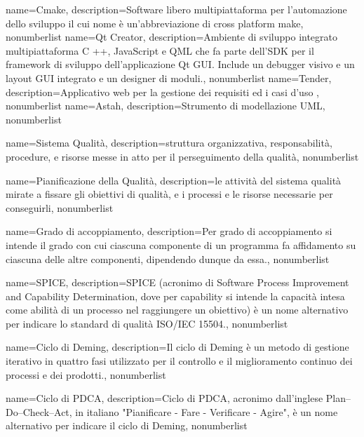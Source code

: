 {
	name={Cmake},
	description={Software libero multipiattaforma per l'automazione dello sviluppo il cui nome è un'abbreviazione di cross platform make},
	nonumberlist
}
{
	name={Qt Creator},
	description={Ambiente di sviluppo integrato multipiattaforma C ++, JavaScript e QML che fa parte dell'SDK per il framework di sviluppo dell'applicazione Qt GUI. Include un debugger visivo e un layout GUI integrato e un designer di moduli.},
	nonumberlist
}
{
	name={Tender},
	description={Applicativo web per la gestione dei requisiti ed i casi d'uso },
	nonumberlist
}
{
	name={Astah},
	description={Strumento di modellazione UML},
	nonumberlist
}

{
	name={Sistema Qualità},
	description={struttura organizzativa, responsabilità, procedure, e risorse messe in atto per il perseguimento della qualità},
	nonumberlist 
}

{
	name={Pianificazione della Qualità},
	description={le attività del sistema qualità mirate a fissare gli obiettivi di qualità, e i processi e le risorse necessarie per conseguirli},
	nonumberlist 
}

{
	name={Grado di accoppiamento},
	description={Per grado di accoppiamento si intende il grado con cui ciascuna componente di un programma fa affidamento su ciascuna delle altre componenti, dipendendo dunque da essa.},
	nonumberlist 
}

{
	name={SPICE},
	description={SPICE (acronimo di Software Process Improvement and Capability Determination, dove per capability si intende la capacità intesa come abilità di un processo nel raggiungere un obiettivo) è un nome alternativo per indicare lo standard di qualità ISO/IEC 15504.}, 
	nonumberlist 
}

{
	name={Ciclo di Deming},
	description={Il ciclo di Deming è un metodo di gestione iterativo in quattro fasi utilizzato per il controllo e il miglioramento continuo dei processi e dei prodotti.}, 
	nonumberlist 
}

{
	name={Ciclo di PDCA},
	description={Ciclo di PDCA, acronimo dall'inglese Plan–Do–Check–Act, in italiano "Pianificare - Fare - Verificare - Agire", è un nome alternativo per indicare il ciclo di Deming}, 
	nonumberlist 
}

